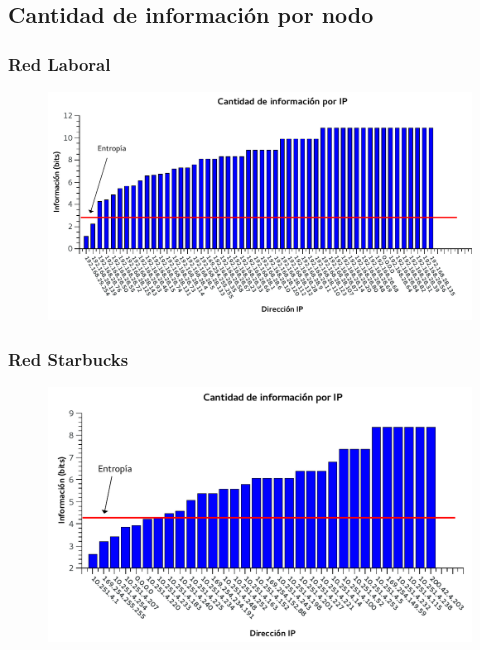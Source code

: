 \FloatBarrier
\subsection{Cantidad de información por nodo}


\FloatBarrier
\subsubsection{Red Laboral}

\begin{figure}[h!]
  \begin{center}
    \includegraphics[scale=0.9]{graficos/informacion-baufest.pdf}
	\caption{}
    \label{fig:info-baufest}  
  \end{center}
\end{figure}


\FloatBarrier
\subsubsection{Red Starbucks}

\begin{figure}[h!]
  \begin{center}
    \includegraphics{graficos/informacion-starbucks.pdf}
	\caption{}
    \label{fig:info-starbucks}  
  \end{center}
\end{figure}

